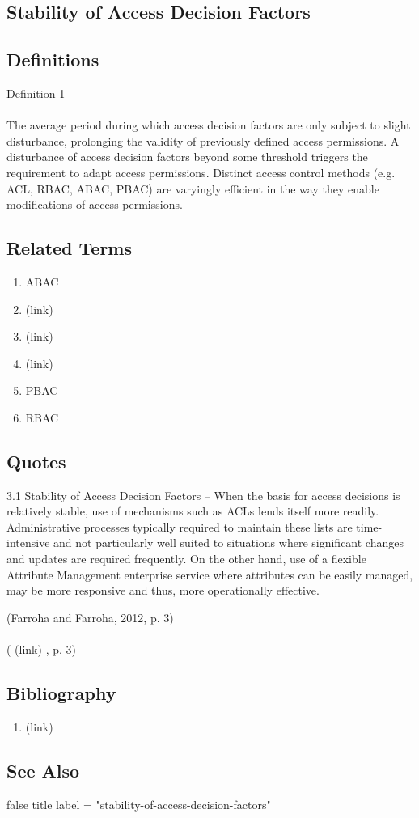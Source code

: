 \newpage \subsection*{Stability of Access Decision Factors } \subsection*{Definitions } \begin{DIC_Def}{Definition 1 }{} \paragraph{} The average period during which access decision factors are only subject to slight disturbance, prolonging the validity of previously defined access permissions. A disturbance of access decision factors beyond some threshold triggers the requirement to adapt access permissions. Distinct access control methods (e.g. ACL, RBAC, ABAC, PBAC) are varyingly efficient in the way they enable modifications of access permissions.  \end{DIC_Def} \subsection*{Related Terms } \begin{enumerate} \item  ABAC  \item  (link) \href{Access (Dictionary Entry) }{ }   \item  (link) \href{Access Control (Dictionary Entry) }{ }   \item  (link) \href{Access Control List (Dictionary Entry) }{ }   \item  PBAC  \item  RBAC  \end{enumerate} \subsection*{Quotes } \begin{DIC_BlockQuote} 3.1 Stability of Access Decision Factors -- When the basis for access decisions is relatively stable, use of mechanisms such as ACLs lends itself more readily. Administrative processes typically required to maintain these lists are time-intensive and not particularly well suited to situations where significant changes and updates are required frequently. On the other hand, use of a flexible Attribute Management enterprise service where attributes can be easily managed, may be more responsive and thus, more operationally effective.  \end{DIC_BlockQuote} (Farroha and Farroha, 2012, p. 3)  \paragraph{} (  (link) \href{Farroha and Farroha, 2012 }{ } , p. 3)  \subsection*{Bibliography } \begin{enumerate} \item  (link) \href{Farroha and Farroha, 2012 }{ }   \end{enumerate} \subsection*{See Also } false  title  label = "stability-of-access-decision-factors"  